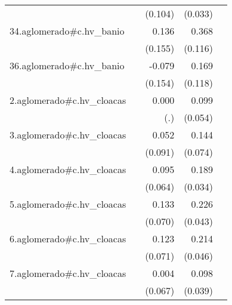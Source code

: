 {\begin{longtable}{l*{4}{D{.}{.}{-1}}}
            &                     &     (0.104)         &     (0.033)         &                     \\
\addlinespace
34.aglomerado#c.hv\_banio&                     &       0.136         &       0.368\sym{**} &                     \\
            &                     &     (0.155)         &     (0.116)         &                     \\
\addlinespace
36.aglomerado#c.hv\_banio&                     &      -0.079         &       0.169         &                     \\
            &                     &     (0.154)         &     (0.118)         &                     \\
\addlinespace
2.aglomerado#c.hv\_cloacas&                     &       0.000         &       0.099         &                     \\
            &                     &         (.)         &     (0.054)         &                     \\
\addlinespace
3.aglomerado#c.hv\_cloacas&                     &       0.052         &       0.144         &                     \\
            &                     &     (0.091)         &     (0.074)         &                     \\
\addlinespace
4.aglomerado#c.hv\_cloacas&                     &       0.095         &       0.189\sym{***}&                     \\
            &                     &     (0.064)         &     (0.034)         &                     \\
\addlinespace
5.aglomerado#c.hv\_cloacas&                     &       0.133         &       0.226\sym{***}&                     \\
            &                     &     (0.070)         &     (0.043)         &                     \\
\addlinespace
6.aglomerado#c.hv\_cloacas&                     &       0.123         &       0.214\sym{***}&                     \\
            &                     &     (0.071)         &     (0.046)         &                     \\
\addlinespace
7.aglomerado#c.hv\_cloacas&                     &       0.004         &       0.098\sym{*}  &                     \\
            &                     &     (0.067)         &     (0.039)         &                     \\

\end{longtable}}
